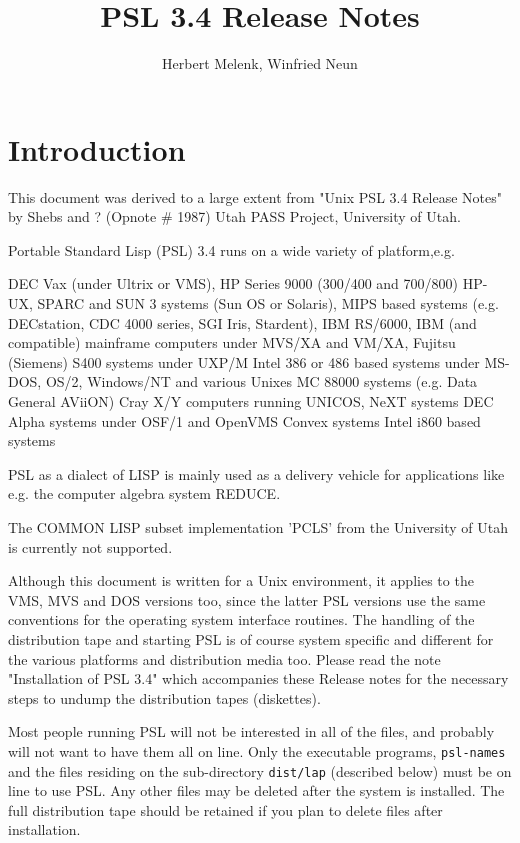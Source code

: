


\title{PSL 3.4 Release Notes}

\author{Herbert Melenk, Winfried Neun}

\section{Introduction}

This document was derived to a large extent from 
"Unix PSL 3.4 Release Notes" by Shebs and ? 
(Opnote # 1987) Utah PASS Project, University of Utah.

Portable Standard Lisp (PSL) 3.4 runs on a wide variety of platform,e.g.

DEC Vax (under Ultrix or VMS), 
HP Series 9000 (300/400 and 700/800) HP-UX, 
SPARC and SUN 3 systems (Sun OS or Solaris), 
MIPS based systems (e.g. DECstation, CDC 4000 series, SGI Iris, Stardent), 
IBM RS/6000, 
IBM (and compatible) mainframe computers under MVS/XA and VM/XA, 
Fujitsu (Siemens) S400 systems under UXP/M
Intel 386 or 486 based systems under MS-DOS, OS/2, Windows/NT and various
Unixes
MC 88000 systems (e.g. Data General AViiON)
Cray X/Y computers running UNICOS,
NeXT systems
DEC Alpha systems under OSF/1 and OpenVMS
Convex systems  
Intel i860 based systems

PSL as a dialect of LISP is mainly used as a delivery vehicle for 
applications like e.g. the computer algebra system REDUCE.

The COMMON LISP subset implementation 'PCLS' from the University of Utah 
is currently not supported.

Although this document is written for a Unix environment, it applies to 
the VMS, MVS and DOS versions too, since the latter PSL versions
use the same conventions for the operating system interface routines.
The handling of the distribution tape and starting PSL is of course 
system specific and different for the various platforms 
and distribution media too. Please read the
note "Installation of PSL 3.4" which accompanies these Release notes
for the necessary steps to undump the distribution tapes (diskettes).

Most people running PSL will not be interested in all of
the files, and probably will not want to have them all on line.  Only
the executable programs, {\tt psl-names} and the files residing on the
sub-directory {\tt dist/lap} (described below) must be on line to use
PSL.  Any other files may be deleted after the system is installed.
The full distribution tape should be retained if you plan to delete
files after installation.  

